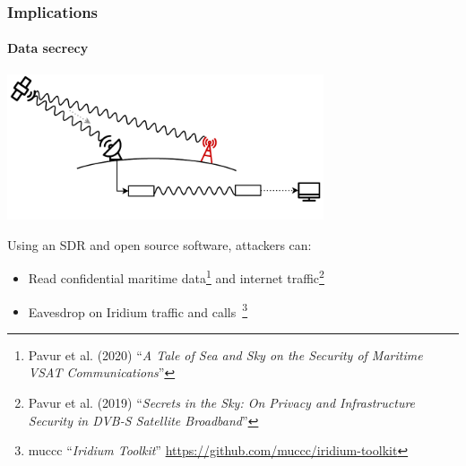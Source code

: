 \documentclass{beamer}
\begin{document}
\def\footnoterule{\only<3->\oldfootnoterule}
\begin{frame}
  \frametitle{Implications}
  \framesubtitle{Data secrecy}

  \begin{center}
    \includegraphics[width=0.7\textwidth]{images/eavesdropping_illustration.pdf}
  \end{center}

  \pause

  Using an SDR and open source software, attackers can:
  \pause
  \begin{itemize}[<+->]
    \item Read confidential maritime data\footnote<3->[1]{Pavur et al. (2020) ``\textit{A Tale of Sea and Sky on the Security of Maritime VSAT Communications}''} and internet traffic\footnote<3->[2]{Pavur et al. (2019) ``\textit{Secrets in the Sky: On Privacy and Infrastructure Security in DVB-S Satellite Broadband}''}
    \item Eavesdrop on Iridium traffic and calls~\footnote<4->[3]{muccc ``\textit{Iridium Toolkit}'' \url{https://github.com/muccc/iridium-toolkit}}
  \end{itemize}
\end{frame}
\end{document}
